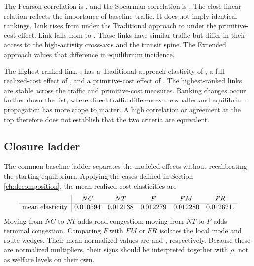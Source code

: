 The Pearson correlation is \GridPearson, and the Spearman correlation is
\GridSpearman. The close linear relation reflects the importance of baseline
traffic. It does not imply identical rankings. Link \GridRiseLink{} rises from
\GridRiseTraditionalRank{} under the Traditional approach to
\GridRiseExtendedRank{} under the primitive-cost effect. Link \GridFallLink{}
falls from \GridFallTraditionalRank{} to \GridFallExtendedRank. These links
have similar traffic but differ in their access to the high-activity cross-axis
and the transit spine. The Extended approach values that difference in
equilibrium incidence.

\begin{table}[H]
\centering
\caption{Highest-ranked physical road links under the primitive-cost welfare
effect}
\label{tab:grid-top-links}

\end{table}

The highest-ranked link, \GridTopLink, has a Traditional-approach elasticity of
\GridTopTraditional, a full realized-cost effect of \GridTopRealized, and a
primitive-cost effect of \GridTopPrimitive. The highest-ranked links are
stable across the traffic and primitive-cost measures. Ranking changes
occur farther down the list, where direct traffic differences are smaller and
equilibrium propagation has more scope to matter. A high correlation or
agreement at the top therefore does not establish that the two criteria are
equivalent.

\subsection{Closure ladder}

The common-baseline ladder separates the modeled effects without recalibrating the
starting equilibrium. Applying the cases defined in Section
\ref{ch:decomposition}, the mean realized-cost elasticities are
\[
\begin{array}{c|ccccc}
  & NC & NT & F & FM & FR\\
\hline
\text{mean elasticity}
  & 0.010594
  & 0.012138
  & 0.012279
  & 0.012280
  & 0.012621 .
\end{array}
\]
Moving from \(NC\) to \(NT\) adds road congestion; moving from \(NT\) to \(F\)
adds terminal congestion. Comparing \(F\) with \(FM\) or \(FR\) isolates the
local mode and route wedges. Their mean normalized values are
\GridMeanModeWedge{} and \GridMeanRouteWedge, respectively. Because these are
normalized multipliers, their signs should be interpreted together with
\(\rho\), not as welfare levels on their own.

